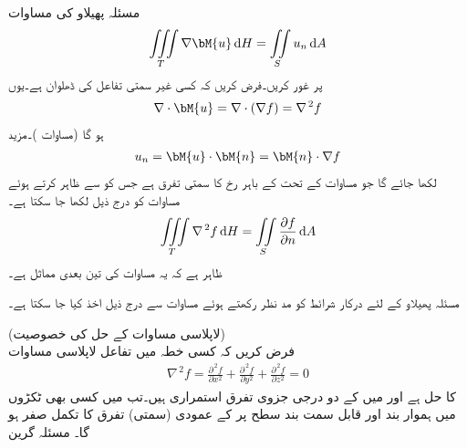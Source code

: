 مسئلہ پھیلاو کی مساوات
\begin{align}\label{مساوات_خطی_تکمل_مسئلہ_پھیلاو_دوبارہ_الف}
\iiint\limits_T \nabla \bM{u}\dif H=\iint\limits_S u_n \dif A
\end{align}
پر غور کریں۔فرض کریں کہ  کسی غیر سمتی تفاعل کی ڈھلوان  ہے۔یوں
\begin{align*}
\nabla \cdot \bM{u}=\nabla \cdot (\nabla f)=\nabla^{\,2}f
\end{align*}
ہو گا (مساوات )۔مزید 
\begin{align*}
u_n=\bM{u}\cdot \bM{n}=\bM{n}\cdot \nabla f
\end{align*}
لکھا جائے گا جو مساوات  کے تحت  کے باہر رخ  کا سمتی تفرق ہے جس کو  سے ظاہر کرتے ہوئے  مساوات  کو درج ذیل لکھا جا سکتا ہے۔
\begin{align}\label{مساوات_خطی_تکمل_مسئلہ_پھیلاو_دوبارہ_ب}
\iiint\limits_T \nabla^{\,2}f\dif H=\iint\limits_S \frac{\partial f}{\partial n}\dif A
\end{align}
ظاہر ہے کہ یہ مساوات  کی تین بعدی مماثل ہے۔

مسئلہ پھیلاو کے لئے درکار شرائط کو مد نظر رکھتے ہوئے  مساوات  سے درج ذیل اخذ کیا جا سکتا ہے۔ 

\quad (لاپلاسی مساوات کے حل کی خصوصیت)\\
فرض کریں کہ کسی خطہ  میں تفاعل  لاپلاسی مساوات
\begin{align*}
\nabla^{\,2}f=\frac{\partial^{\,2} f}{\partial x^2}+\frac{\partial^{\,2} f}{\partial y^2}+\frac{\partial^{\,2} f}{\partial z^2}=0
\end{align*}
کا حل ہے اور  میں  کے دو درجی جزوی تفرق استمراری ہیں۔تب  میں کسی بھی ٹکڑوں میں ہموار  بند اور قابل سمت بند سطح  پر  کے عمودی  (سمتی) تفرق کا تکمل صفر ہو گا۔
\quad مسئلہ گرین\\

